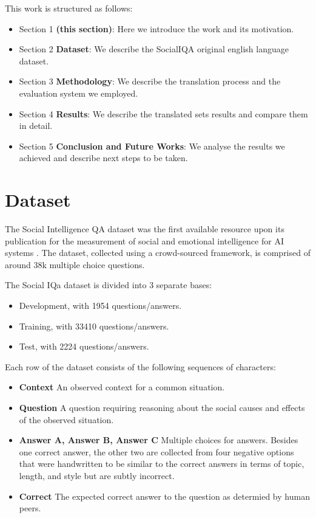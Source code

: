 \documentclass{article}
\begin{document}
This work is structured as follows:
\begin{itemize}
    \item Section 1 \textbf{(this section)}: Here we introduce the work and its
    motivation.
    \item Section 2 \textbf{Dataset}: We describe the SocialIQA original english
    language dataset.
    \item Section 3 \textbf{Methodology}: We describe the translation process
    and the evaluation system we employed.
    \item Section 4 \textbf{Results}: We describe the translated sets results
    and compare them in detail.
    \item Section 5 \textbf{Conclusion and Future Works}: We analyse the results
    we achieved and describe next steps to be taken.
\end{itemize}

\section{Dataset}
The Social Intelligence QA dataset was the first available resource upon its
publication for the measurement of social and emotional intelligence for AI
systems \cite{socialiqa}. The dataset, collected using a crowd-sourced framework,  is comprised
of around 38k multiple choice questions.

The Social IQa dataset is divided into 3 separate bases:
\begin{itemize}
    \item Development, with 1954 questions/answers.
    \item Training, with 33410 questions/answers.
    \item Test, with 2224 questions/answers.
\end{itemize}

Each row of the dataset consists of the following sequences of characters:

\begin{itemize}
    \item \textbf{Context} An observed context for a common situation.
    \item \textbf{Question} A question requiring reasoning about the social
    causes and effects of the observed situation.
    \item \textbf{Answer A, Answer B, Answer C} Multiple choices for answers.
    Besides one correct answer, the other two are collected from four negative
    options that were handwritten to be similar to the correct answers in terms
    of topic, length, and style but are subtly incorrect.
    \item \textbf{Correct} The expected correct answer to the question as
    determied by human peers.
\end{itemize}
\end{document}

